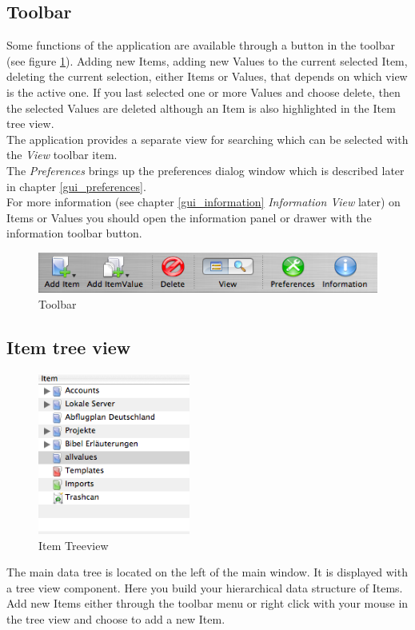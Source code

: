 \documentclass[12pt,a4]{article}
\begin{document}
\subsection{Toolbar}
\label{gui_toolbar}
\medskip
Some functions of the application are available through a button in the toolbar (see figure \ref{image:toolbar}). Adding new Items, adding new Values to the current selected Item, deleting the current selection, either Items or Values, that depends on which view is the active one. If you last selected one or more Values and choose delete, then the selected Values are deleted although an Item is also highlighted in the Item tree view. \\
The application provides a separate view for searching which can be selected with the \textit{View} toolbar item. \\
The \textit{Preferences} brings up the preferences dialog window which is described later in chapter \ref{gui_preferences}. \\
For more information (see chapter \ref{gui_information} \textit{Information View} later) on Items or Values you should open the information panel or drawer with the information toolbar button.
% 
\begin{figure}[ht]
\includegraphics[width=13.5cm]{images/Toolbar_shot.png}
\caption{Toolbar}
\label{image:toolbar}
\end{figure}
\noindent
\subsection{Item tree view}
\label{gui_itemoutlineview}
\medskip
% 
\begin{figure}[ht]
\begin{center}
\includegraphics[width=5.0cm]{images/OutlineItemView.png}
\end{center}
\caption{Item Treeview}
\label{image:itemoutlineview}
\end{figure}
\noindent
%
The main data tree is located on the left of the main window. It is displayed with a tree view component. Here you build your hierarchical data structure of Items. \\
Add new Items either through the toolbar menu or right click with your mouse in the tree view and choose to add a new Item.
\end{document}
